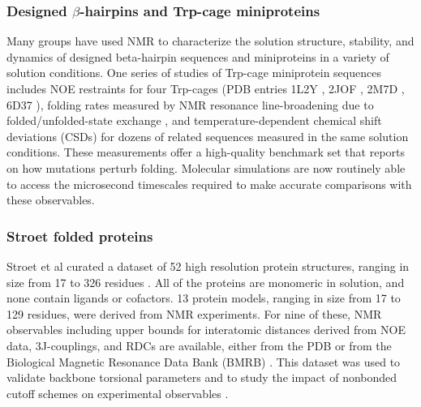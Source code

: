 \documentclass[9pt,review]{livecoms}
\begin{document}
\subsubsection{Designed $\beta$-hairpins and Trp-cage miniproteins}
\label{sub2:designed_beta}

Many groups have used NMR to characterize the solution structure, stability, and dynamics of designed beta-hairpin sequences \cite{blanco_short_1994,ramirez-alvarado_novo_1996,de_alba_turn_1997,maynard_origin_1998,stanger_rules_1998,cochran_tryptophan_2001,ramirez-alvarado_elongation_2001,pastor_combinatorial_2002,russell_stability_2003,skelton_hairpin_2003,fesinmeyer_enhanced_2004,espinosa_autonomously_2005,andersen_minimization_2006,honda_crystal_2008,kier_stabilizing_2010,scian_mutational_2013,jimenez_design_2014,anderson_nascent_2016,morales_design_2019,richaud_folding_2021,peintner_pushing_2022} and miniproteins \cite{struthers_design_1996,mcknight_nmr_1997,struthers_design_1998,imperiali_uniquely_1999,vermeulen_solution_2004,cornilescu_solution_2007,gronwald_evolutionary_2008} in a variety of solution conditions.
One series of studies of Trp-cage miniprotein sequences \cite{neidigh_designing_2002,lin_helical_2004,barua_trp-cage_2008,scian_crystal_2012,byrne_circular_2013,graham_reversing_2019} includes NOE restraints for four Trp-cages (PDB entries 1L2Y \cite{neidigh_designing_2002}, 2JOF \cite{barua_trp-cage_2008}, 2M7D \cite{byrne_circular_2013}, 6D37 \cite{graham_reversing_2019}), folding rates measured by NMR resonance line-broadening due to folded/unfolded-state exchange \cite{scian_mutational_2013,byrne_folding_2014}, and temperature-dependent chemical shift deviations (CSDs) for dozens of related sequences measured in the same solution conditions.
These measurements offer a high-quality benchmark set that reports on how mutations perturb folding.
Molecular simulations are now routinely able to access the microsecond timescales required to make accurate comparisons with these observables.

\subsubsection{Stroet folded proteins}
\label{sub2:stroet}

Stroet et al curated a dataset of 52 high resolution protein structures, ranging in size from 17 to 326 residues \cite{stroet_validation_2024}.
All of the proteins are monomeric in solution, and none contain ligands or cofactors.
13 protein models, ranging in size from 17 to 129 residues, were derived from NMR experiments.
For nine of these, NMR observables including upper bounds for interatomic distances derived from NOE data, 3J-couplings, and RDCs are available, either from the PDB or from the Biological Magnetic Resonance Data Bank (BMRB) \cite{ulrich_biomagresbank_2008,romero_biomagresbank_2020,hoch_biological_2023}.
This dataset was used to validate backbone torsional parameters \cite{diem_hamiltonian_2020} and to study the impact of nonbonded cutoff schemes on experimental observables \cite{diem_effect_2020}.
\end{document}
